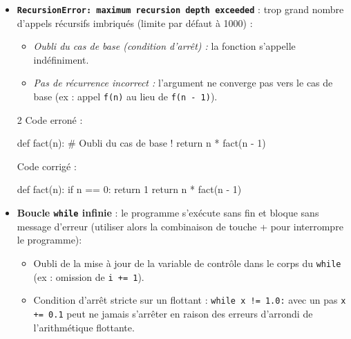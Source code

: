 \documentclass[11pt,a4paper]{article}
\begin{document}
\begin{tcolorbox}[left=0cm,title=\bf{\faBug \; 8. Récursion et boucles infinies (RecursionError et terminaison)},colbacktitle=cfond]
\begin{itemize}
	\item[\textbullet] \textbf{\texttt{RecursionError: maximum recursion depth exceeded}} : trop grand nombre d'appels récursifs imbriqués (limite par défaut à 1000) :
	\begin{itemize}
		\item \textit{Oubli du cas de base (condition d'arrêt) :} la fonction s'appelle indéfiniment.
		\item \textit{Pas de récurrence incorrect :} l'argument ne converge pas vers le cas de base (ex : appel \texttt{f(n)} au lieu de \texttt{f(n - 1)}).
	\end{itemize}
	\setlength{\multicolsep}{0pt}
	\begin{multicols}{2}
		\textcolor{BrickRed}{\faTimesCircle \; Code erroné :}
		\begin{python}
def fact(n):
    # Oubli du cas de base !
    return n * fact(n - 1)
		\end{python}
		\textcolor{OliveGreen}{\faCheckCircle \; Code corrigé :}
		\begin{python}
def fact(n):
    if n == 0:
        return 1
    return n * fact(n - 1)
		\end{python}
	\end{multicols}

	\item[\textbullet] \textbf{Boucle \texttt{while} infinie} : le programme s'exécute sans fin et bloque sans message d'erreur (utiliser alors la combinaison de touche \keys{\ctrl}+ pour interrompre le programme):
	\begin{itemize}
		\item Oubli de la mise à jour de la variable de contrôle dans le corps du \texttt{while} (ex : omission de \texttt{i += 1}).
		\item Condition d'arrêt stricte sur un flottant : \texttt{while x != 1.0:} avec un pas \texttt{x += 0.1} peut ne jamais s'arrêter en raison des erreurs d'arrondi de l'arithmétique flottante.
	\end{itemize}
\end{itemize}
\end{tcolorbox}
\end{document}
